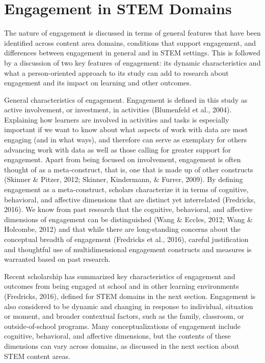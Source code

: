 \documentclass[]{book}
\theoremstyle{definition}
\theoremstyle{definition}
\theoremstyle{definition}
\theoremstyle{remark}
\begin{document}
\section{Engagement in STEM Domains}\label{engagement-in-stem-domains}

The nature of engagement is discussed in terms of general features that
have been identified across content area domains, conditions that
support engagement, and differences between engagement in general and in
STEM settings. This is followed by a discussion of two key features of
engagement: its dynamic characteristics and what a person-oriented
approach to its study can add to research about engagement and its
impact on learning and other outcomes.

General characteristics of engagement. Engagement is defined in this
study as active involvement, or investment, in activities (Blumenfeld et
al., 2004). Explaining how learners are involved in activities and tasks
is especially important if we want to know about what aspects of work
with data are most engaging (and in what ways), and therefore can serve
as exemplary for others advancing work with data as well as those
calling for greater support for engagement. Apart from being focused on
involvement, engagement is often thought of as a meta-construct, that
is, one that is made up of other constructs (Skinner \& Pitzer, 2012;
Skinner, Kindermann, \& Furrer, 2009). By defining engagement as a
meta-construct, scholars characterize it in terms of cognitive,
behavioral, and affective dimensions that are distinct yet interrelated
(Fredricks, 2016). We know from past research that the cognitive,
behavioral, and affective dimensions of engagement can be distinguished
(Wang \& Eccles, 2012; Wang \& Holcombe, 2012) and that while there are
long-standing concerns about the conceptual breadth of engagement
(Fredricks et al., 2016), careful justification and thoughtful use of
multidimensional engagement constructs and measures is warranted based
on past research.

Recent scholarship has summarized key characteristics of engagement and
outcomes from being engaged at school and in other learning environments
(Fredricks, 2016), defined for STEM domains in the next section.
Engagement is also considered to be dynamic and changing in response to
individual, situation or moment, and broader contextual factors, such as
the family, classroom, or outside-of-school programs. Many
conceptualizations of engagement include cognitive, behavioral, and
affective dimensions, but the contents of these dimensions can vary
across domains, as discussed in the next section about STEM content
areas.
\end{document}
